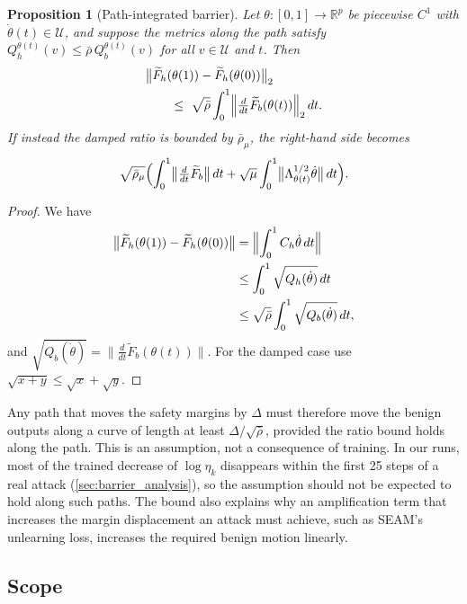 \documentclass[11pt]{article}
\newtheorem{proposition}{Proposition}
\newcommand{\R}{\mathbb{R}}
\newcommand{\U}{\mathcal{U}}
\newcommand{\Ft}{\widetilde{F}}
\newcommand{\Ch}{C_{h}}
\newcommand{\etak}{\eta_{k}}
\begin{document}
\begin{proposition}[Path-integrated barrier]
\label{prop:path}
Let $\theta:[0,1]\to\R^p$ be piecewise $C^1$ with $\dot\theta(t)\in\U$, and suppose the metrics along the path satisfy $Q_h^{\theta(t)}(v)\le\bar\rho\,Q_b^{\theta(t)}(v)$ for all $v\in\U$ and $t$. Then
\begin{equation*}
\begin{aligned}
&\bigl\|\Ft_h(\theta(1))-\Ft_h(\theta(0))\bigr\|_2\\
&\qquad\le\ \sqrt{\bar\rho}\int_0^1\Bigl\|\tfrac{d}{dt}\Ft_b(\theta(t))\Bigr\|_2\,dt .
\end{aligned}
\end{equation*}
If instead the damped ratio is bounded by $\bar\rho_\mu$, the right-hand side becomes
\begin{equation*}
\sqrt{\bar\rho_\mu}\Bigl(\int_0^1\bigl\|\tfrac{d}{dt}\Ft_b\bigr\|\,dt+\sqrt\mu\int_0^1\bigl\|\Lambda_{\theta(t)}^{1/2}\dot\theta\bigr\|\,dt\Bigr).
\end{equation*}
\end{proposition}
\begin{proof}
We have
\begin{equation*}
\begin{aligned}
\bigl\|\Ft_h(\theta(1))-\Ft_h(\theta(0))\bigr\|&=\Bigl\|\int_0^1\Ch\dot\theta\,dt\Bigr\|\\
&\le\int_0^1\sqrt{Q_h(\dot\theta)}\,dt\\
&\le\sqrt{\bar\rho}\int_0^1\sqrt{Q_b(\dot\theta)}\,dt,
\end{aligned}
\end{equation*}
and $\sqrt{Q_b(\dot\theta)}=\|\tfrac{d}{dt}\Ft_b(\theta(t))\|$. For the damped case use $\sqrt{x+y}\le\sqrt x+\sqrt y$.
\end{proof}
Any path that moves the safety margins by $\Delta$ must therefore move the benign outputs along a curve of length at least $\Delta/\sqrt{\bar\rho}$, provided the ratio bound holds along the path. This is an assumption, not a consequence of training. In our runs, most of the trained decrease of $\log\etak$ disappears within the first 25 steps of a real attack (\cref{sec:barrier_analysis}), so the assumption should not be expected to hold along such paths. The bound also explains why an amplification term that increases the margin displacement an attack must achieve, such as SEAM's unlearning loss, increases the required benign motion linearly.

\subsection{Scope}
\label{app:scope}
\end{document}
